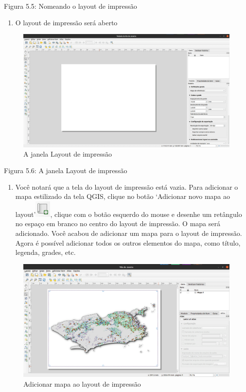 \documentclass[
]{krantz}
\providecommand{\tightlist}{%
  \setlength{\itemsep}{0pt}\setlength{\parskip}{0pt}}
\begin{document}
Figura 5.5: Nomeando o layout de impressão

\begin{enumerate}
\def\labelenumi{\arabic{enumi}.}
\setcounter{enumi}{2}
\tightlist
\item
  O layout de impressão será aberto
\end{enumerate}

\begin{figure}
\centering
\includegraphics{media/modulo5/new-print-layout-window.png}
\caption{A janela Layout de impressão}
\end{figure}

Figura 5.6: A janela Layout de impressão

\begin{enumerate}
\def\labelenumi{\arabic{enumi}.}
\setcounter{enumi}{3}
\tightlist
\item
  Você notará que a tela do layout de impressão está vazia. Para adicionar o mapa estilizado da tela QGIS, clique no botão `Adicionar novo mapa ao layout'\includegraphics{media/modulo5/add_new_map_to_layout.png}, clique com o botão esquerdo do mouse e desenhe um retângulo no espaço em branco no centro do layout de impressão. O mapa será adicionado. Você acabou de adicionar um mapa para o layout de impressão. Agora é possível adicionar todos os outros elementos do mapa, como título, legenda, grades, etc.
\end{enumerate}

\begin{figure}
\centering
\includegraphics{media/modulo5/print-layout-map.png}
\caption{Adicionar mapa ao layout de impressão}
\end{figure}
\end{document}
